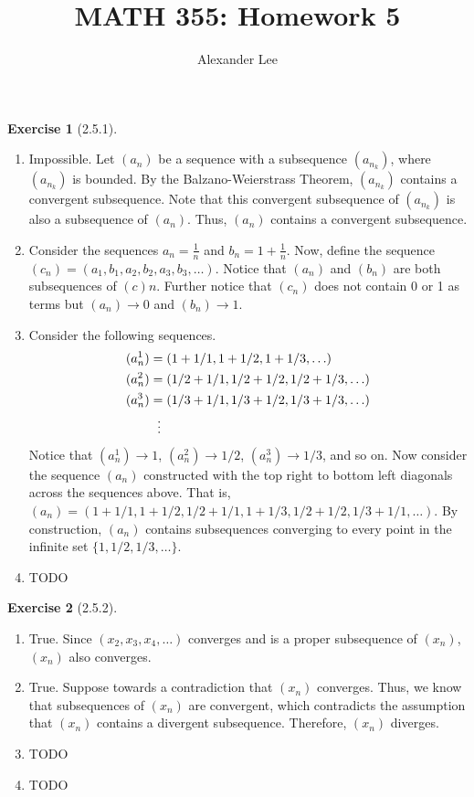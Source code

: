\documentclass{amsart}
\title{MATH 355: Homework 5}
\author{Alexander Lee}
\theoremstyle{definition}
\newtheorem{exercise}{Exercise}
\begin{document}
\maketitle

\begin{exercise}[2.5.1]
  \begin{enumerate}[label={(\alph*)}]
    \item Impossible. Let $(a_n)$ be a sequence with a subsequence $(a_{n_k})$,
      where $(a_{n_k})$ is bounded. By the Balzano-Weierstrass Theorem,
      $(a_{n_k})$ contains a convergent subsequence. Note that this convergent
      subsequence of $(a_{n_k})$ is also a subsequence of $(a_n)$. Thus, $(a_n)$
      contains a convergent subsequence.
    \item Consider the sequences $a_n = \frac{1}{n}$ and $b_n = 1 +
      \frac{1}{n}$. Now, define the sequence $(c_n) = (a_1, b_1, a_2, b_2, a_3,
      b_3, \ldots)$. Notice that $(a_n)$ and $(b_n)$ are both subsequences of
      $(c)n$. Further notice that $(c_n)$ does not contain 0 or 1 as terms but
      $(a_n) \rightarrow 0$ and $(b_n) \rightarrow 1$.
    \item Consider the following sequences.
      \begin{align*}
        (a^1_n) &= (1 + 1/1, 1 + 1/2, 1 + 1/3, \ldots) \\
        (a^2_n) &= (1/2 + 1/1, 1/2 + 1/2, 1/2 + 1/3, \ldots) \\
        (a^3_n) &= (1/3 + 1/1, 1/3 + 1/2, 1/3 + 1/3, \ldots) \\
        &\vdotswithin{\dots}
      \end{align*}
      Notice that $(a^1_n) \rightarrow 1$, $(a^2_n) \rightarrow 1/2$, $(a^3_n)
      \rightarrow 1/3$, and so on. Now consider the sequence $(a_n)$ constructed
      with the top right to bottom left diagonals across the sequences above.
      That is, $(a_n) = (1 + 1/1, 1 + 1/2, 1/2 + 1/1, 1 + 1/3, 1/2 + 1/2, 1/3 +
      1/1, \ldots)$. By construction, $(a_n)$ contains subsequences converging
      to every point in the infinite set $\{1, 1/2, 1/3, \ldots\}$.
    \item TODO
  \end{enumerate}
\end{exercise}

\begin{exercise}[2.5.2]
  \begin{enumerate}[label={(\alph*)}]
    \item True. Since $(x_2, x_3, x_4, \ldots)$ converges and is a proper
      subsequence of $(x_n)$, $(x_n)$ also converges.
    \item True. Suppose towards a contradiction that $(x_n)$ converges. Thus, we
      know that subsequences of $(x_n)$ are convergent, which contradicts the
      assumption that $(x_n)$ contains a divergent subsequence. Therefore,
      $(x_n)$ diverges.
    \item TODO
    \item TODO
  \end{enumerate}
\end{exercise}
\end{document}

